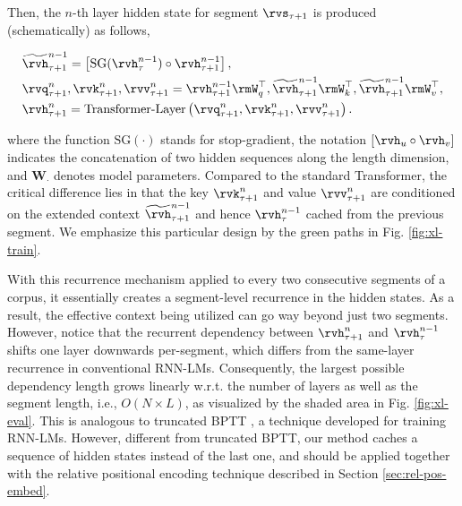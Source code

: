 Then, the $n$-th layer hidden state for segment $\rvs_{\tau+1}$ is produced (schematically) as follows,
\par\nobreak
\vspace{-0.5em}
\small
\begin{align*}\label{eqn:reuse}
	&\widetilde{\rvh}_{\tau+1}^{n-1} = \left[ \text{SG}(\rvh_{\tau}^{n-1}) \circ \rvh_{\tau+1}^{n-1} \right],
		\\
	&\rvq_{\tau+1}^{n}, \rvk_{\tau+1}^{n}, \rvv_{\tau+1}^{n} = \rvh_{\tau+1}^{n-1} \rmW_q^\top, \widetilde{\rvh}_{\tau+1}^{n-1} \rmW_k^\top, \widetilde{\rvh}_{\tau+1}^{n-1} \rmW_v^\top,
		\\
	&\rvh_{\tau+1}^{n} = \text{Transformer-Layer}\left(\rvq_{\tau+1}^{n}, \rvk_{\tau+1}^{n}, \rvv_{\tau+1}^{n}\right).
\end{align*}
\normalsize
\vspace{-1.5em}

\noindent where the function $\text{SG}(\cdot)$ stands for stop-gradient, the notation $[\rvh_u \circ \rvh_v]$ indicates the concatenation of two hidden sequences along the length dimension, and $\mathbf{W}_\cdot$ denotes model parameters.
Compared to the standard Transformer, the critical difference lies in that the key $\rvk_{\tau+1}^{n}$ and value $\rvv_{\tau+1}^{n}$ are conditioned on the extended context $\widetilde{\rvh}_{\tau+1}^{n-1}$ and hence $\rvh_{\tau}^{n-1}$ cached from the previous segment.
We emphasize this particular design by the green paths in Fig. \ref{fig:xl-train}.

With this recurrence mechanism applied to every two consecutive segments of a corpus, it essentially creates a segment-level recurrence in the hidden states.
As a result, the effective context being utilized can go way beyond just two segments.
However, notice that the recurrent dependency between $\rvh_{\tau+1}^{n}$ and $\rvh_{\tau}^{n-1}$ shifts one layer downwards per-segment, which differs from the same-layer recurrence in conventional RNN-LMs.
Consequently, the largest possible dependency length grows linearly w.r.t. the number of layers as well as the segment length, i.e., $O(N \times L)$, as visualized by the shaded area in Fig. \ref{fig:xl-eval}.
This is analogous to truncated BPTT \citep{mikolov2010recurrent}, a technique developed for training RNN-LMs. However, different from truncated BPTT, our method caches a sequence of hidden states instead of the last one, and should be applied together with the relative positional encoding technique described in Section \ref{sec:rel-pos-embed}.

